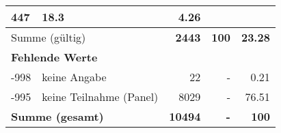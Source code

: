 \begin{longtable}{lXrrr}
       \num{447} &
       \num[round-mode=places,round-precision=2]{18.3} &
         \num[round-mode=places,round-precision=2]{4.26} \\
     \midrule
     \multicolumn{2}{l}{Summe (gültig)} &
       \textbf{\num{2443}} &
     \textbf{\num{100}} &
       \textbf{\num[round-mode=places,round-precision=2]{23.28}} \\
     \multicolumn{5}{l}{\textbf{Fehlende Werte}}\\
       -998 &
       keine Angabe &
         \num{22} &
        - &
         \num[round-mode=places,round-precision=2]{0.21} \\
       -995 &
       keine Teilnahme (Panel) &
         \num{8029} &
        - &
         \num[round-mode=places,round-precision=2]{76.51} \\
     \midrule
     \multicolumn{2}{l}{\textbf{Summe (gesamt)}} &
          \textbf{\num{10494}} &
        \textbf{-} &
        \textbf{\num{100}} \\
     \bottomrule
     \end{longtable}
     
